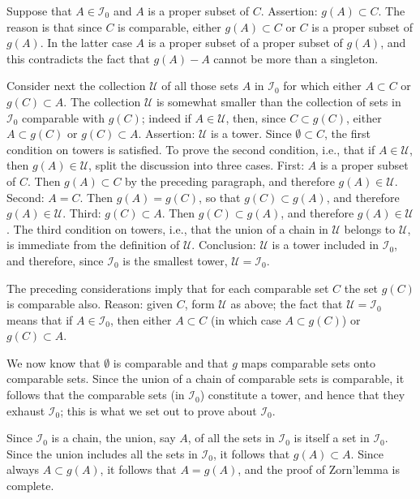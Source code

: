 Suppose that $A \in \mathcal{I}_{0}$ and $A$ is a proper subset of $C$. Assertion: $g(A) \subset C$. The reason is that since $C$ is comparable, either $g(A) \subset C$ or $C$ is a proper subset of $g(A)$. In the latter case $A$ is a proper subset of a proper subset of $g(A)$, and this contradicts the fact that $g(A) - A$ cannot be more than a singleton. 

Consider next the collection $\mathcal{U}$ of all those sets $A$ in $\mathcal{I}_{0}$ for which either $A \subset C$ or $g(C) \subset A$. The collection $\mathcal{U}$ is somewhat smaller than the collection of sets in $\mathcal{I}_{0}$ comparable with $g(C)$; indeed if $A \in \mathcal{U}$, then, since $C \subset g(C)$, either $A \subset g(C)$ or $g(C) \subset A$. Assertion: $\mathcal{U}$ is a tower. Since $\emptyset \subset C$, the first condition on towers is satisfied. To prove the second condition, i.e., that if $A \in \mathcal{U}$, then $g(A) \in \mathcal {U}$, split the discussion into three cases. First: $A$ is a proper subset of $C$. Then $g(A) \subset C$ by the preceding paragraph, and therefore $g(A) \in \mathcal{U}$. Second: $A = C$. Then $g(A) = g(C)$, so that $g(C) \subset g(A)$, and therefore $g(A) \in \mathcal{U}$. Third: $g(C) \subset A$. Then $g(C) \subset g(A)$, and therefore $g(A) \in \mathcal{U}$. The third condition on towers, i.e., that the union of a chain in $\mathcal{U}$ belongs to $\mathcal{U}$, is immediate from the definition of $\mathcal{U}$. Conclusion: $\mathcal{U}$ is a tower included in $\mathcal{I}_{0}$, and therefore, since $\mathcal{I}_{0}$ is the smallest tower, $\mathcal{U} = \mathcal{I}_{0}$. 

The preceding considerations imply that for each comparable set $C$ the set $g(C)$ is comparable also. Reason: given $C$, form $\mathcal{U}$ as above; the fact that $\mathcal{U} = \mathcal{I}_{0}$ means that if $A \in \mathcal{I}_{0}$, then either $A \subset C$ (in which case $A \subset g(C)$) or $g(C) \subset A$.

We now know that $\emptyset$ is comparable and that $g$ maps comparable sets onto comparable sets. Since the union of a chain of comparable sets is comparable, it follows that the comparable sets (in $\mathcal{I}_{0}$) constitute a tower, and hence that they exhaust $\mathcal{I}_{0}$; this is what we set out to prove about $\mathcal{I}_{0}$. 

Since $\mathcal{I}_{0}$ is a chain, the union, say $A$, of all the sets in $\mathcal{I}_{0}$ is itself a set in $\mathcal{I}_{0}$. Since the union includes all the sets in $\mathcal{I}_{0}$, it follows that $g(A) \subset A$. Since always $A \subset g(A)$, it follows that $A = g(A)$, and the proof of Zorn'lemma is complete.

